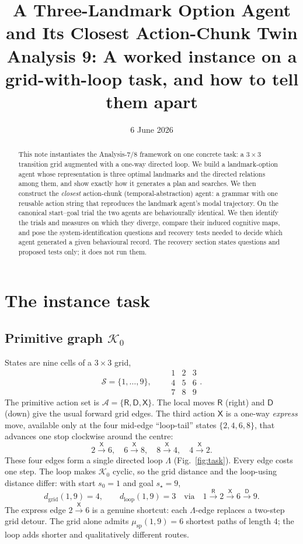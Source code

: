 \documentclass[11pt]{article}
\title{A Three-Landmark Option Agent and Its Closest Action-Chunk Twin\\
\large Analysis 9: A worked instance on a grid-with-loop task, and how to tell them apart}
\author{}
\date{6 June 2026}
\begin{document}
\maketitle

\begin{abstract}
This note instantiates the Analysis-7/8 framework on one concrete task: a $3\times3$
transition grid augmented with a one-way directed loop. We build a landmark-option agent
whose representation is three optimal landmarks and the directed relations among them,
and show exactly how it generates a plan and searches. We then construct the
\emph{closest} action-chunk (temporal-abstraction) agent: a grammar with one reusable
action string that reproduces the landmark agent's modal trajectory. On the canonical
start--goal trial the two agents are behaviourally identical. We then identify the trials
and measures on which they diverge, compare their induced cognitive maps, and pose the
system-identification questions and recovery tests needed to decide which agent generated
a given behavioural record. The recovery section states questions and proposed tests only;
it does not run them.
\end{abstract}

\section{The instance task}

\subsection{Primitive graph $\mathcal K_0$}

States are nine cells of a $3\times3$ grid,
\[
\mathcal S=\{1,\dots,9\},\qquad
\begin{smallmatrix}
1&2&3\\[1pt]4&5&6\\[1pt]7&8&9
\end{smallmatrix}.
\]
The primitive action set is $\mathcal A=\{\mathsf R,\mathsf D,\mathsf X\}$. The local
moves $\mathsf R$ (right) and $\mathsf D$ (down) give the usual forward grid edges. The
third action $\mathsf X$ is a one-way \emph{express} move, available only at the four
mid-edge ``loop-tail'' states $\{2,4,6,8\}$, that advances one stop clockwise around the
centre:
\[
2\xrightarrow{\mathsf X}6,\quad
6\xrightarrow{\mathsf X}8,\quad
8\xrightarrow{\mathsf X}4,\quad
4\xrightarrow{\mathsf X}2 .
\]
These four edges form a single directed loop $\Lambda$ (Fig.~\ref{fig:task}). Every edge
costs one step. The loop makes $\mathcal K_0$ cyclic, so the grid distance and the
loop-using distance differ: with start $s_0=1$ and goal $s_\star=9$,
\[
d_{\mathrm{grid}}(1,9)=4,
\qquad
d_{\mathrm{loop}}(1,9)=3
\quad\text{via}\quad
1\xrightarrow{\mathsf R}2\xrightarrow{\mathsf X}6\xrightarrow{\mathsf D}9 .
\]
The express edge $2\xrightarrow{\mathsf X}6$ is a genuine shortcut: each $\Lambda$-edge
replaces a two-step grid detour. The grid alone admits $\mu_{\mathrm{sp}}(1,9)=6$
shortest paths of length $4$; the loop adds shorter and qualitatively different routes.
\end{document}
